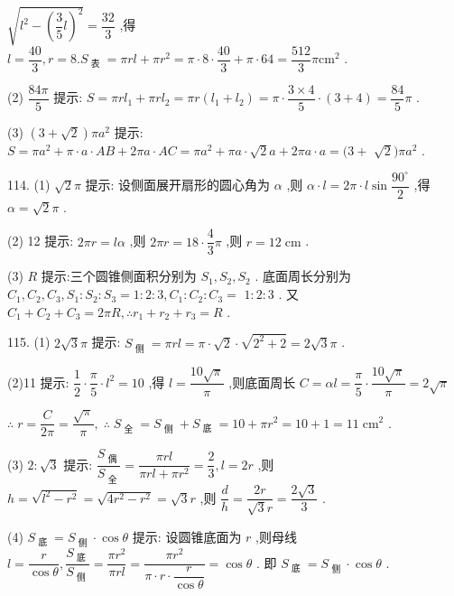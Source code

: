 $\sqrt{{l}^{2} - {\left( \dfrac{3}{5}l\right) }^{2}} = \dfrac{32}{3}$ ,得 $l = \dfrac{40}{3},r = 8.{S}_{\text{ 表 }} = {\pi rl} + \pi {r}^{2} = \pi  \cdot  8 \cdot  \dfrac{40}{3} + \pi  \cdot  {64} = \dfrac{512}{3}\pi {\mathrm{{cm}}}^{2}$ .

(2) $\dfrac{84\pi }{5}$ 提示: $S = {\pi r}{l}_{1} + {\pi r}{l}_{2} = {\pi r}\left( {{l}_{1} + {l}_{2}}\right)  = \pi  \cdot  \dfrac{3 \times  4}{5} \cdot  \left( {3 + 4}\right)  = \dfrac{84}{5}\pi$ .

(3) $\left( {3 + \sqrt{2}}\right) \pi {a}^{2}$ 提示: $S = \pi {a}^{2} + \pi  \cdot  a \cdot  {AB} + {2\pi a} \cdot  {AC} = \pi {a}^{2} + {\pi a} \cdot  \sqrt{2}a + {2\pi a} \cdot  a = (3 +$  $\sqrt{2})\pi {a}^{2}$ .

114. (1) $\sqrt{2}\pi$ 提示: 设侧面展开扇形的圆心角为 $\alpha$ ,则 $\alpha  \cdot  l = {2\pi } \cdot  l\sin \dfrac{{90}^{ \circ  }}{2}$ ,得 $\alpha  = \sqrt{2}\pi$ .

(2) 12 提示: ${2\pi r} = {l\alpha }$ ,则 ${2\pi r} = {18} \cdot  \dfrac{4}{3}\pi$ ,则 $r = {12}\mathrm{\;{cm}}$ .

(3) $R$ 提示:三个圆锥侧面积分别为 ${S}_{1},{S}_{2},{S}_{2}$ . 底面周长分别为 ${C}_{1},{C}_{2},{C}_{3},{S}_{1} : {S}_{2} : {S}_{3} = 1 : 2 : 3,{C}_{1} : {C}_{2} : {C}_{3} =$  $1 : 2 : 3$ . 又 ${C}_{1} + {C}_{2} + {C}_{3} = {2\pi R},\therefore {r}_{1} + {r}_{2} + {r}_{3} = R$ .

115. (1) $2\sqrt{3}\pi$ 提示: ${S}_{\text{ 侧 }} = {\pi rl} = \pi  \cdot  \sqrt{2} \cdot  \sqrt{{2}^{2} + 2} = 2\sqrt{3}\pi$ .

(2)11 提示: $\dfrac{1}{2} \cdot  \dfrac{\pi }{5} \cdot  {l}^{2} = {10}$ ,得 $l = \dfrac{{10}\sqrt{\pi }}{\pi }$ ,则底面周长 $C = {\alpha l} = \dfrac{\pi }{5} \cdot  \dfrac{{10}\sqrt{\pi }}{\pi } = 2\sqrt{\pi }$

$\therefore \;r = \dfrac{C}{2\pi } = \dfrac{\sqrt{\pi }}{\pi },\;\therefore \;{S}_{\text{ 全 }} = {S}_{\text{ 侧 }} + {S}_{\text{ 底 }} = {10} + \pi {r}^{2} = {10} + 1 = {11}{\mathrm{\;{cm}}}^{2}$ .

(3) $2 : \sqrt{3}$ 提示: $\dfrac{{S}_{\text{ 偶 }}}{{S}_{\text{ 全 }}} = \dfrac{\pi rl}{{\pi rl} + \pi {r}^{2}} = \dfrac{2}{3},l = {2r}$ ,则 $h = \sqrt{{l}^{2} - {r}^{2}} = \sqrt{4{r}^{2} - {r}^{2}} = \sqrt{3}r$ ,则 $\dfrac{d}{h} = \dfrac{2r}{\sqrt{3}r} = \dfrac{2\sqrt{3}}{3}$ .

(4) ${S}_{\text{ 底 }} = {S}_{\text{ 侧 }} \cdot  \cos \theta$ 提示: 设圆锥底面为 $r$ ,则母线 $l = \dfrac{r}{\cos \theta },\dfrac{{S}_{\text{ 底 }}}{{S}_{\text{ 侧 }}} = \dfrac{\pi {r}^{2}}{\pi rl} = \dfrac{\pi {r}^{2}}{\pi  \cdot  r \cdot  \dfrac{r}{\cos \theta }} = \cos \theta$ . 即 ${S}_{\text{ 底 }} = {S}_{\text{ 侧 }} \cdot  \cos \theta$ .

